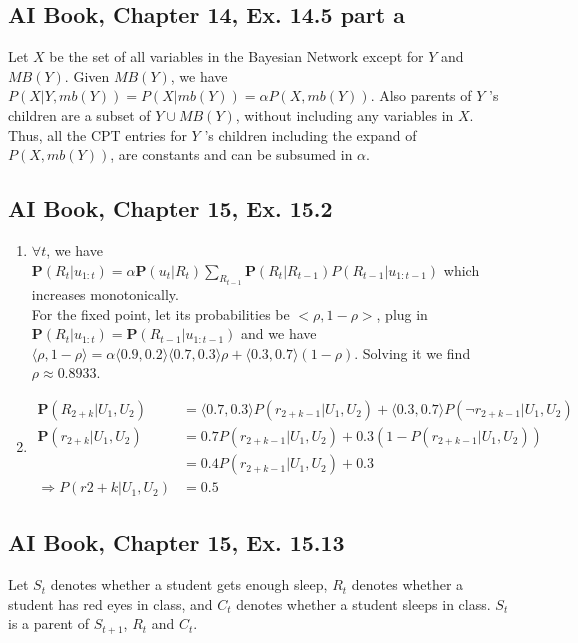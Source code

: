 \documentclass{article}
\theoremstyle{definition} %
\begin{document}
\subsection*{AI Book, Chapter 14, Ex. 14.5 part a}
Let $X$ be the set of all variables in the Bayesian Network except for $Y$ and $MB(Y )$.
Given $MB(Y)$, we have $P(X|Y,mb(Y)) = P(X|mb(Y)) = \alpha P(X,mb(Y))$. 
Also parents of $Y$ ’s children are a subset of ${Y }\cup MB(Y)$, without including any variables in $X$.
Thus, all the CPT entries for $Y$ ’s children including the expand of $P(X,mb(Y))$, are constants and can be subsumed in $\alpha$.


\subsection*{AI Book, Chapter 15, Ex. 15.2}
\begin{enumerate}[label=\alph*.]
    \item $\forall t$, we have $\mathbf{P}(R_t | u_{1: t})=\alpha \mathbf{P}(u_t | R_t) \sum_{R_{t-1}} \mathbf{P}(R_t | R_{t-1}) P(R_{t-1} | u_{1: t-1})$ which increases monotonically.\\
    For the fixed point, let its probabilities be $<\rho, 1-\rho>$, plug in $\mathbf{P}(R_t | u_{1: t})=\mathbf{P}(R_{t-1} | u_{1: t-1})$ and we have $\langle\rho, 1-\rho\rangle=\alpha\langle 0.9,0.2\rangle\langle 0.7,0.3\rangle \rho+\langle 0.3,0.7\rangle(1-\rho)$. Solving it we find $\rho \approx 0.8933$.
    \item %
    \begin{align*}
        \mathbf{P}(R_{2+k} | U_1, U_2) & =\langle 0.7,0.3\rangle P(r_{2+k-1} | U_1, U_2)+\langle 0.3,0.7\rangle P(\neg r_{2+k-1} | U_1, U_2) \\
        \mathbf{P}(r_{2+k} | U_1, U_2) & =0.7 P(r_{2+k-1} | U_1, U_2)+0.3(1-P(r_{2+k-1} | U_1, U_2)) \\
        & =0.4 P(r_{2+k-1} | U_1, U_2)+0.3\\
        \Rightarrow P(r{2+k}|U_1, U_2) &= 0.5
    \end{align*}
\end{enumerate}

\subsection*{AI Book, Chapter 15, Ex. 15.13}
Let $S_t$ denotes whether a student gets enough sleep, $R_t$ denotes whether a student has red eyes in class, and $C_t$ denotes whether a student sleeps in class. $S_t$ is a parent of $S_{t+1}$, $R_t$ and $C_t$.
\end{document}
